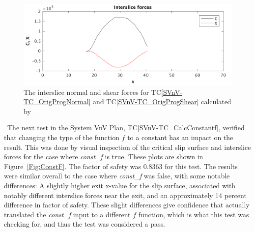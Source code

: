 \documentclass[12pt, titlepage]{article}
\newcommand{\tcref}[1]{TC\ref{#1}}
\begin{document}
\begin{figure}[h!]
	\begin{center}
		\includegraphics[width=1.0\textwidth]{Forces.png}
		\caption{The interslice normal and shear forces for  
		\tcref{SVnV-TC_OrigProgNormal} and  \tcref{SVnV-TC_OrigProgShear}
			calculated by \progname{}}
		\label{Fig:Forces}
	\end{center}
\end{figure}

~\newline \noindent The next test in the System VnV Plan, 
\tcref{SVnV-TC_CalcConstantf}, 
verified that changing the type of the function $f$ to a constant has an impact 
on the result. This was done by visual inspection of the critical slip surface 
and interslice forces for the case where \textit{const\_f} is true. These plots 
are shown in Figure~\ref{Fig:ConstF}. The factor of safety was 0.8363 for this 
test. The results were similar overall to the case where \textit{const\_f} was 
false, with some notable differences: A slightly higher exit x-value for the 
slip surface, associated with notably different interslice forces near the 
exit, and an approximately 14 percent difference in factor of safety. These 
slight differences give confidence that \progname{} actually translated the 
\textit{const\_f} input to a different $f$ function, which is what this test 
was checking for, and thus the test was considered a pass.
\end{document}

